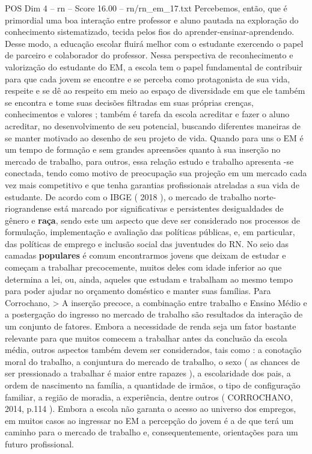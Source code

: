 \begin{textsample}{POS Dim 4 – rn – Score 16.00 – rn/rn\_em\_17.txt}
Percebemos, então, que é primordial uma boa interação entre professor e aluno pautada na exploração do conhecimento sistematizado, tecida pelos fios do aprender-ensinar-aprendendo.
Desse modo, a educação escolar fluirá melhor com o estudante exercendo o papel de parceiro e colaborador do professor.
Nessa perspectiva de reconhecimento e valorização do estudante do EM, a escola tem o papel fundamental de contribuir para que cada jovem se encontre e se perceba como protagonista de sua vida, respeite e se dê ao respeito em meio ao espaço de diversidade em que ele também se encontra e tome suas decisões filtradas em suas próprias crenças, conhecimentos e valores ; também é tarefa da escola acreditar e fazer o aluno acreditar, no desenvolvimento de seu potencial, buscando diferentes maneiras de se manter motivado ao desenho de seu projeto de vida.
Quando para uns o EM é um tempo de formação e sem grandes apreensões quanto à sua inserção no mercado de trabalho, para outros, essa relação estudo e trabalho apresenta -se conectada, tendo como motivo de preocupação sua projeção em um mercado cada vez mais competitivo e que tenha garantias profissionais atreladas a sua vida de estudante.
De acordo com o IBGE ( 2018 ), o mercado de trabalho norte-riograndense está marcado por significativas e persistentes desigualdades de gênero e \textbf{raça}, sendo este um aspecto que deve ser considerado nos processos de formulação, implementação e avaliação das políticas públicas, e, em particular, das políticas de emprego e inclusão social das juventudes do RN.
No seio das camadas \textbf{populares} é comum encontrarmos jovens que deixam de estudar e começam a trabalhar precocemente, muitos deles com idade inferior ao que determina a lei, ou, ainda, aqueles que estudam e trabalham ao mesmo tempo para poder ajudar no orçamento doméstico e manter suas famílias.
Para Corrochano, > A inserção precoce, a combinação entre trabalho e Ensino Médio e a postergação do ingresso no mercado de trabalho são resultados da interação de um conjunto de fatores.
Embora a necessidade de renda seja um fator bastante relevante para que muitos comecem a trabalhar antes da conclusão da escola média, outros aspectos também devem ser considerados, tais como : a conotação moral do trabalho, a conjuntura do mercado de trabalho, o sexo ( as chances de ser pressionado a trabalhar é maior entre rapazes ), a escolaridade dos pais, a ordem de nascimento na família, a quantidade de irmãos, o tipo de configuração familiar, a região de moradia, a experiência, dentre outros ( CORROCHANO, 2014, p.114 ).
Embora a escola não garanta o acesso ao universo dos empregos, em muitos casos ao ingressar no EM a percepção do jovem é a de que terá um caminho para o mercado de trabalho e, consequentemente, orientações para um futuro profissional.

\end{textsample}
